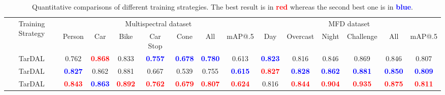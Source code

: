 \documentclass[10pt,twocolumn,letterpaper]{article}
\begin{document}
\begin{table*}[!htb]
	\centering
	\renewcommand\arraystretch{1.1} 
	\setlength{\tabcolsep}{1.6mm}
	\begin{tabular}{|c|cccccc|c|ccccc|c|}
		\hline
		\multirow{2}{*}{\footnotesize Training Strategy}&\multicolumn{7}{c|}{\footnotesize Multispectral dataset}&\multicolumn{6}{c|}{\footnotesize MFD dataset}\\
		\cline{2-14} 
		~&\footnotesize Person&\footnotesize Car&\footnotesize Bike&\footnotesize Car Stop 
		&\footnotesize Cone &\footnotesize All&\footnotesize mAP@.5&\footnotesize Day&\footnotesize Overcast&\footnotesize Night&\footnotesize Challenge&\footnotesize All&\footnotesize mAP@.5\\
		
		\hline
		\footnotesize TarDAL&\footnotesize 0.762&\footnotesize\textcolor{red}{\textbf{0.868}}&\footnotesize 0.833&\footnotesize  \textcolor{blue}{\textbf{0.757}} &\footnotesize \textcolor{blue}{\textbf{0.678}}&\footnotesize \textcolor{blue}{\textbf{0.780}}&\footnotesize 0.613&\footnotesize \textcolor{blue}{\textbf{0.823}}&\footnotesize 0.816&\footnotesize 0.846&\footnotesize 0.869 &\footnotesize 0.846&\footnotesize 0.807\\
		\hline 
		
		\footnotesize TarDAL&\footnotesize \textcolor{blue}{\textbf{0.827}}&\footnotesize 0.862&\footnotesize 0.881&\footnotesize 0.667&\footnotesize  0.539&\footnotesize 0.755&\footnotesize \textcolor{blue}{\textbf{0.615}}&\footnotesize \textcolor{red}{\textbf{0.827}}&\footnotesize \textcolor{blue}{\textbf{0.828}}&\footnotesize \textcolor{blue}{\textbf{0.862}}&\footnotesize \textcolor{blue}{\textbf{0.881}}&\footnotesize \textcolor{blue}{\textbf{0.850}}&\footnotesize \textcolor{blue}{\textbf{0.809}}\\
		\hline 
		
		\footnotesize TarDAL&\footnotesize \textcolor{red}{\textbf{0.843}}&\footnotesize \textcolor{blue}{\textbf{0.863}}&\footnotesize \textcolor{red}{\textbf{0.892}}&\footnotesize \textcolor{red}{\textbf{0.762}} &\footnotesize\textcolor{red}{\textbf{0.679}}&\footnotesize \textcolor{red}{\textbf{0.807}}&\footnotesize \textcolor{red}{\textbf{0.624}}&\footnotesize 0.816&\footnotesize \textcolor{red}{\textbf{0.844}}&\footnotesize \textcolor{red}{\textbf{0.904}}&\footnotesize\textcolor{red}{\textbf{0.935}} &\footnotesize \textcolor{red}{\textbf{0.875}}&\footnotesize \textcolor{red}{\textbf{0.811}}\\
		\hline 
		
		\hline 
	\end{tabular}
	\vspace{-0.2cm}
	\caption{Quantitative comparisons of different training strategies. The best result is in {\textcolor{red}{\textbf{red}}} whereas the second best one is in {\textcolor{blue}{\textbf{blue}}}.}
	\label{tab: training}	
\end{table*}
\end{document}
